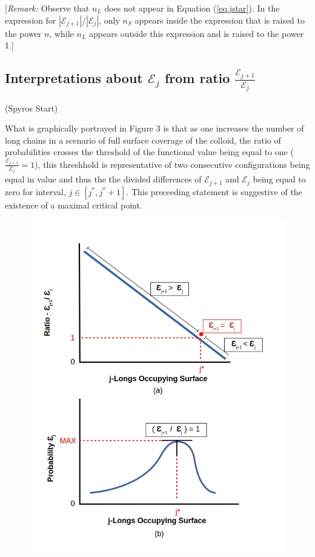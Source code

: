 \documentclass[journal=mamobx,manuscript=article]{achemso}
\begin{document}
[\textit{Remark:}  Observe that $n_L$ does not appear in Equation (\ref{eq.jstar}).  
In the expression for $|\mathcal{E}_{j+1}|/|\mathcal{E}_j|$,   only $n_S$ appears inside the 
expression that is raised to the power $n$, while $n_L$ appears outside this expression and is
raised to the power 1.]  

\subsection{Interpretations about $\mathcal{E}_{j}$ from ratio $\frac{\mathcal{E}_{j+1}}{\mathcal{E}_{j}}$}

(Spyros Start)

What is graphically portrayed in Figure 3 is that as one increases the number of long chains in a scenario of full surface coverage of the colloid, the ratio of probabilities crosses the threshold of the functional value being equal to one ($\frac{\mathcal{E}_{j+1}}{\mathcal{E}_{j}}=1$), this threshhold is representative of two consecutive configurations being equal in value and thus the the divided differences of $\mathcal{E}_{j+1}$ and $\mathcal{E}_{j}$ being equal to zero for interval,  $j\in[j^*, j^*+1]$. This preceeding statement is suggestive of the existence of a maximal critical point. 

\begin{figure}[H]
\includegraphics[scale=0.50]{fig9ab.jpg}
\caption{}
\label{figure 9}
\end{figure}
\end{document}
